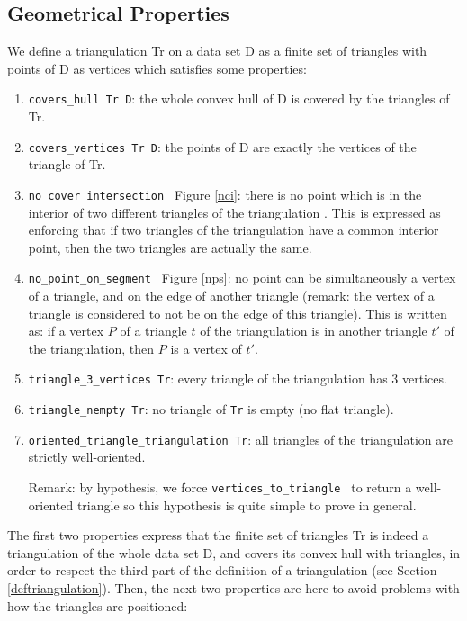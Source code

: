 \documentclass[a4paper,10pt]{article}
\def\ttt#1#2{{\tt{\color{black}#1} #2}}
\begin{document}
\subsection{Geometrical Properties}
\label{definition_triangulation}
We define a triangulation Tr on a data set D as a finite set of triangles with points of D as vertices which satisfies some properties:
\begin{enumerate}
\item \ttt{covers\_hull}{Tr D}: the whole convex hull of D is covered by the triangles of Tr.
\item \ttt{covers\_vertices}{Tr D}: the points of D are exactly the vertices of the triangle of Tr.
\item \ttt{no\_cover\_intersection}{} Figure \ref{nci}: there is no point which is in the interior of two different triangles of the triangulation . This is expressed as enforcing that if two triangles of the triangulation have a common interior point, then the two triangles are actually the same.
  \item\ttt{no\_point\_on\_segment}{} Figure \ref{nps}: no point can be simultaneously a vertex of a triangle, and on the edge of another triangle (remark: the vertex of a triangle is considered to not be on the edge of this triangle). This is written as: if a vertex $P$ of a triangle $t$ of the triangulation is in another triangle $t'$ of the triangulation, then $P$ is a vertex of $t'$.
\item \ttt{triangle\_3\_vertices}{Tr}: every triangle of the triangulation has 3 vertices.
\item \ttt{triangle\_nempty}{Tr}: no triangle of {\tt Tr} is empty (no flat triangle).
\item \ttt{oriented\_triangle\_triangulation}{Tr}: all triangles of the triangulation are strictly well-oriented.

  Remark: by hypothesis, we force \ttt{vertices\_to\_triangle}{} to return a well-oriented triangle so this hypothesis is quite simple to prove in general.
\end{enumerate}
The first two properties express that the finite set of triangles Tr is indeed a triangulation of the whole data set D, and covers its convex hull with triangles, in order to respect the third part of the definition of a triangulation (see Section \ref{deftriangulation}).
Then, the next two properties are here to avoid problems with how the triangles are positioned: 
\end{document}
